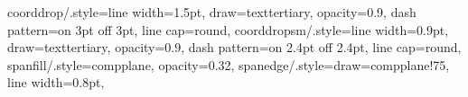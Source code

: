 {  %
  coorddrop/.style={line width=1.5pt, draw=texttertiary, opacity=0.9,
    dash pattern=on 3pt off 3pt, line cap=round},
  coorddropsm/.style={line width=0.9pt, draw=texttertiary, opacity=0.9,
    dash pattern=on 2.4pt off 2.4pt, line cap=round},
  spanfill/.style={compplane, opacity=0.32},
  spanedge/.style={draw=compplane!75, line width=0.8pt},
}
